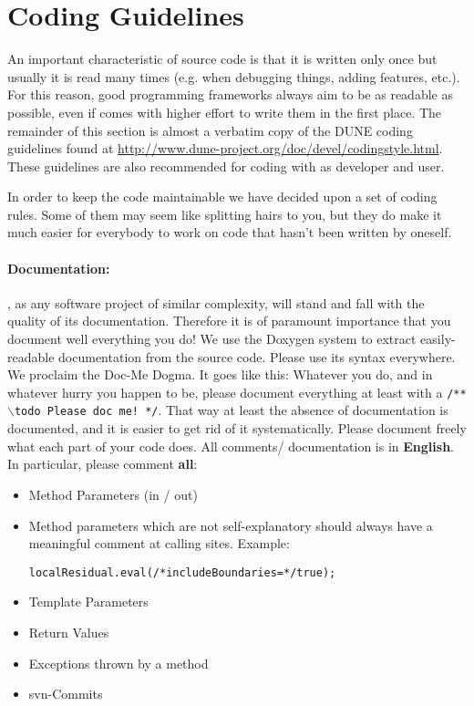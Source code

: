 \section{Coding Guidelines}
\label{guidelines}

An important characteristic of source code is that it is written only
once but usually it is read many times (e.g. when debugging things,
adding features, etc.). For this reason, good programming frameworks
always aim to be as readable as possible, even if comes with higher
effort to write them in the first place. The remainder of this section
is almost a verbatim copy of the DUNE coding guidelines found at
\url{http://www.dune-project.org/doc/devel/codingstyle.html}. These guidelines
are also recommended for coding with \Dumux as developer and user.

In order to keep the code maintainable we have decided upon a set of
coding rules.  Some of them may seem like splitting hairs to you, but
they do make it much easier for everybody to work on code that hasn't
been written by oneself.


\paragraph{Documentation:}
\Dumux, as any software project of similar complexity, will stand and fall
with the quality of its documentation.
Therefore it is of paramount importance that you document well everything you
do! We use the Doxygen system to extract easily-readable documentation from the
source code. Please use its syntax everywhere.\\
We proclaim the Doc-Me Dogma. It goes like this: Whatever you do, and in whatever hurry you
happen to be, please document everything at least with a \texttt{/** $\backslash$todo Please doc me! */}.
That way at least the absence of documentation is documented, and it is easier
to get rid of it systematically.
Please document freely what each part of your code does. All comments/ documentation
is in \textbf{English}. In particular, please comment \textbf{all}:
\begin{itemize}
  \item Method Parameters (in / out)
  \item Method parameters which are not self-explanatory should always
        have a meaningful comment at calling sites. Example:
  \begin{lstlisting}[style=DumuxCode]
    localResidual.eval(/*includeBoundaries=*/true);
  \end{lstlisting}
  \item Template Parameters
  \item Return Values
  \item Exceptions thrown by a method
  \item svn-Commits
\end{itemize}

